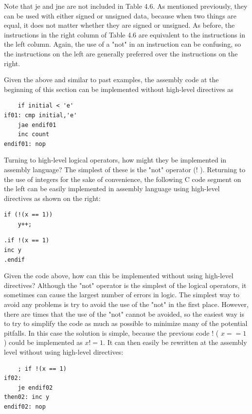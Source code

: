 \documentclass[10pt]{article}
\begin{document}
Note that je and jne are not included in Table 4.6. As mentioned previously, they can be used with either signed or unsigned data, because when two things are equal, it does not matter whether they are signed or unsigned. As before, the instructions in the right column of Table 4.6 are equivalent to the instructions in the left column. Again, the use of a "not" in an instruction can be confusing, so the instructions on the left are generally preferred over the instructions on the right.

Given the above and similar to past examples, the assembly code at the beginning of this section can be implemented without high-level directives as

\begin{verbatim}
    if initial < 'e'
if01: cmp initial,'e'
    jae endif01
    inc count
endif01: nop
\end{verbatim}

Turning to high-level logical operators, how might they be implemented in assembly language? The simplest of these is the "not" operator (! ). Returning to the use of integers for the sake of convenience, the following C code segment on\\
the left can be easily implemented in assembly language using high-level directives as shown on the right:

\begin{verbatim}
if (!(x == 1))
    y++;
\end{verbatim}

\begin{verbatim}
.if !(x == 1)
inc y
.endif
\end{verbatim}

Given the code above, how can this be implemented without using high-level directives? Although the "not" operator is the simplest of the logical operators, it sometimes can cause the largest number of errors in logic. The simplest way to avoid any problems is try to avoid the use of the "not" in the first place. However, there are times that the use of the "not" cannot be avoided, so the easiest way is to try to simplify the code as much as possible to minimize many of the potential pitfalls. In this case the solution is simple, because the previous code ! ( $x==1$ ) could be implemented as $x!=1$. It can then easily be rewritten at the assembly level without using high-level directives:

\begin{verbatim}
    ; if !(x == 1)
if02:
    je endif02
then02: inc y
endif02: nop
\end{verbatim}
\end{document}
